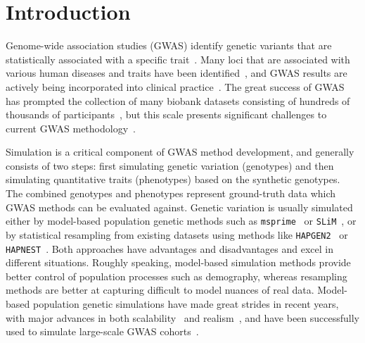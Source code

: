 \documentclass[unnumsec,webpdf,modern,large,namedate]{oup-authoring-template}%
\begin{document}

\maketitle

\section{Introduction}

Genome-wide association studies (GWAS)
identify genetic variants that are statistically
associated with a specific trait~\citep{uffelmann2021}.
Many loci that are associated with various human diseases and
traits have been
identified~\citep[e.g.][]{yengo2022,mathieson2023},
and GWAS results are actively being incorporated into clinical
practice~\citep{visscher2017}.
The great success of GWAS has prompted the collection of many biobank
datasets consisting of hundreds of thousands of
participants~\citep{tanjo2021practical},
but this scale presents significant challenges to
current GWAS methodology~\citep{uffelmann2021}.

Simulation is a critical component of GWAS method development, and
generally consists of two steps:
first simulating genetic variation (genotypes)
and then simulating quantitative traits (phenotypes) based on the
synthetic genotypes.
The combined genotypes and phenotypes represent ground-truth data
which GWAS methods can be evaluated against.
Genetic variation is
usually simulated either by model-based population genetic
methods such as
\texttt{msprime}~\citep{baumdicker2022efficient}
or \texttt{SLiM}~\citep{haller2023},
or by statistical resampling from existing datasets
using methods like \texttt{HAPGEN2}~\citep{su2011hapgen2}
or \texttt{HAPNEST}~\citep{wharrie2023hapnest}.
Both approaches have advantages and disadvantages and excel
in different situations.
Roughly speaking, model-based simulation methods
provide better control of population processes such as demography,
whereas resampling methods are better at capturing
difficult to model nuances of real data.
Model-based population genetic simulations have made
great strides in recent years, with major advances in both
scalability~\citep{kelleher2016efficient,kelleher2018efficient,haller2018tree}
and realism~\citep{adrion2020,anderson2023}, and
have been successfully used to simulate large-scale GWAS
cohorts~\cite[e.g.][]{martin2017,zaidi2020}.
\end{document}
